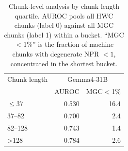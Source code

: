 \begin{table}[t]
\centering
\caption{Chunk-level analysis by chunk length quartile. AUROC pools all HWC chunks (label 0) against all MGC chunks (label 1) within a bucket. ``MGC$<$1\%'' is the fraction of machine chunks with degenerate NPR $<1$, concentrated in the shortest bucket.}
\label{tab:chunk-by-length}
\begin{tabular}{lrr}
\toprule
Chunk length & \multicolumn{2}{c}{Gemma4-31B} \\
 & AUROC & MGC$<$1\% \\
\midrule
$\leq$37 & 0.530 & 16.4 \\
37--82 & 0.700 & 2.4 \\
82--128 & 0.743 & 1.4 \\
>128 & 0.784 & 2.6 \\
\bottomrule
\end{tabular}
\end{table}
